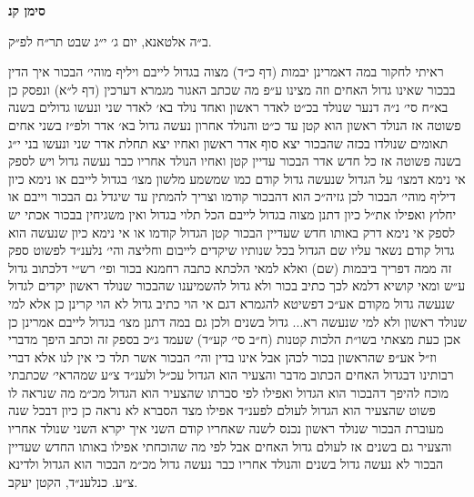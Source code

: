 \documentclass[12pt, openany]{book}
\newcommand{\chapname}{}
\newcommand{\newchap}[1]{
	\addcontentsline{toc}{chapter}{#1}
	\renewcommand{\chapname}{#1}
		\begin{center}
			\textbf{%
\fontsize{16pt}{16pt}\selectfont
				#1}
		\end{center}
}
\begin{document}
\newchap{סימן קנ}
\begin{multicols}{2}
ב״ה אלטאנא, יום ג׳ י״ג שבט תר״ח לפ״ק.\\\vspace{0pt}

ראיתי לחקור במה דאמרינן יבמות (דף כ״ד) מצוה בגדול לייבם ויליף מוהי׳ הבכור איך הדין בבכור שאינו גדול האחים וזה מצינו ע״פ מה שכתב האגור מגמרא דערכין (דף ל״א) ונפסק כן בא״ח סי׳ נ״ה דנער שנולד בכ״ט לאדר ראשון ואחד נולד בא׳ לאדר שני ונעשו גדולים בשנה פשוטה אז הנולד ראשון הוא קטן עד כ״ט והנולד אחרון נעשה גדול בא׳ אדר ולפ״ז בשני אחים תאומים שנולדו בכזה שהבכור יצא סוף אדר ראשון ואחיו יצא תחלת אדר שני ונעשו בני י״ג בשנה פשוטה אז כל חדש אדר הבכור עדיין קטן ואחיו הנולד אחריו כבר נעשה גדול ויש לספק אי נימא דמצו׳ על הגדול שנעשה גדול קודם כמו שמשמע מלשון מצו׳ בגדול לייבם או נימא כיון דיליף מוהי׳ הבכור לכן גזיה״כ הוא דהבכור קודמו וצריך להמתין עד שיגדל גם הבכור וייבם או יחלוץ ואפילו את״ל כיון דתנן מצוה בגדול לייבם הכל תלוי בגדול ואין משגיחין בבכור אכתי יש לספק אי נימא דרק באותו חדש שעדיין הבכור קטן הגדול קודמו או אי נימא כיון שנעשה הוא גדול קודם נשאר עליו שם הגדול בכל שנותיו שיקדים לייבום וחליצה והי׳ נלענ״ד לפשוט ספק זה ממה דפריך ביבמות (שם) ואלא למאי הלכתא כתבה רחמנא בכור ופי׳ רש״י דלכתוב גדול ע״ש ומאי קושיא דלמא לכך כתיב בכור ולא גדול להשמיענו שהבכור שנולד ראשון יקדים לגדול שנעשה גדול מקודם אע״כ דפשיטא להגמרא דגם אי הוי כתיב גדול לא הוי קרינן כן אלא למי שנולד ראשון ולא למי שנעשה רא... גדול בשנים ולכן גם במה דתנן מצו׳ בגדול לייבם אמרינן כן אכן כעת מצאתי בשו״ת הלכות קטנות (ח״ב סי׳ קע״ד) שעמד ג״כ בספק זה וכתב היפך מדברי וז״ל אע״פ שהראשון בכור לכהן אבל אינו בדין והי׳ הבכור אשר תלד כי אין לנו אלא דברי רבותינו דבגדול האחים הכתוב מדבר והצעיר הוא הגדול עכ״ל ולענ״ד צ״ע שמהראי׳ שכתבתי מוכח להיפך דהבכור הוא הגדול ואפילו לפי סברתו שהצעיר הוא הגדול מכ״מ מה שנראה לו פשוט שהצעיר הוא הגדול לעולם לפענ״ד אפילו מצד הסברא לא נראה כן כיון דבכל שנה מעוברת הבכור שנולד ראשון נכנס לשנה שאחריו קודם השני איך יקרא השני שנולד אחריו והצעיר גם בשנים אז לעולם גדול האחים אבל לפי מה שהוכחתי אפילו באותו החדש שעדיין הבכור לא נעשה גדול בשנים והנולד אחריו כבר נעשה גדול מכ״מ הבכור הוא הגדול ולדינא צ״ע. כנלענ״ד, הקטן יעקב.\\\vspace{0pt}

\end{multicols}\newpage
\end{document}
